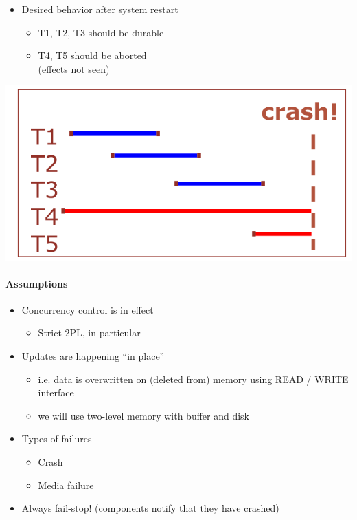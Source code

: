 \begin{minipage}{0.2\textwidth}
  \begin{itemize}
  \item Desired behavior after system restart
    \begin{itemize}
    \item {\color{blue} T1, T2, T3} should be
      {\color{blue} durable}
    \item {\color{red} T4, T5} should be {\color{red} aborted} \\
      (effects not seen)
    \end{itemize}
  \end{itemize}
\end{minipage}%
\begin{minipage}{0.2\textwidth}
  \includegraphics[scale=0.1]{graphics/crash.png}
\end{minipage}

\paragraph{Assumptions}
\begin{itemize}
\item Concurrency control is in effect
  \begin{itemize}
  \item Strict 2PL, in particular
  \end{itemize}

\item Updates are happening ``in place''
  \begin{itemize}
  \item i.e. data is overwritten on (deleted from) memory
    using READ / WRITE interface
  \item we will use two-level memory with buffer and disk
  \end{itemize}

\item Types of failures
  \begin{itemize}
  \item Crash
  \item Media failure
  \end{itemize}

\item Always fail-stop! (components notify that they have crashed)
\end{itemize}


